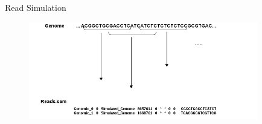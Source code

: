 \documentclass{beamer}
\begin{document}

\begin{frame}{Read Simulation }
\begin{figure}[H]
\centering
\includegraphics[width=10cm]{pics/readsampling2.png}
\label{hist}
\end{figure}
\end{frame}


\end{document}
